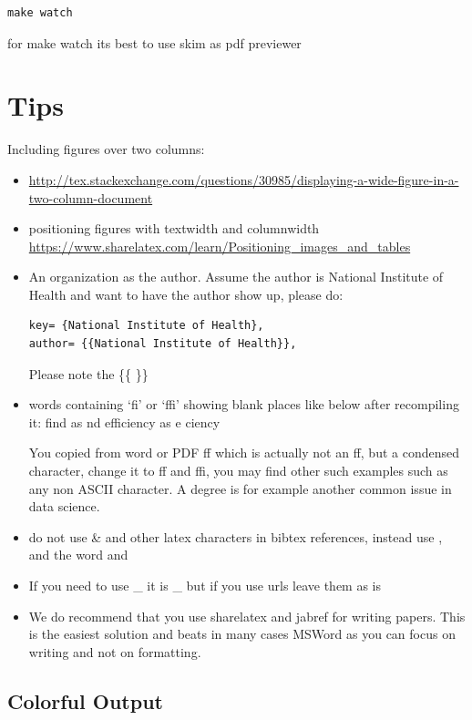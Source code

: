 \begin{verbatim}
make watch
\end{verbatim}

for make watch its best to use skim as pdf previewer


\section{Tips}\label{tips}

Including figures over two columns:

\begin{itemize}
\item
  \url{http://tex.stackexchange.com/questions/30985/displaying-a-wide-figure-in-a-two-column-document}
\item
  positioning figures with textwidth and columnwidth
  \url{https://www.sharelatex.com/learn/Positioning_images_and_tables}
\item
  An organization as the author. Assume the author is National Institute
  of Health and want to have the author show up, please do:

\begin{verbatim}
key= {National Institute of Health},
author= {{National Institute of Health}},
\end{verbatim}

  Please note the \{\{ \}\}
\item
  words containing `fi' or `ffi' showing blank places like below after
  recompiling it: find as nd efficiency as e ciency

  You copied from word or PDF ff which is actually not an ff, but a
  condensed character, change it to ff and ffi, you may find other such
  examples such as any non ASCII character. A degree is for example
  another common issue in data science.
\item
  do not use \textbar{} \& and other latex characters in bibtex
  references, instead use , and the word and
\item
  If you need to use \_ it is \_ but if you use urls leave them as is
\item
  We do recommend that you use sharelatex and jabref for writing papers.
  This is the easiest solution and beats in many cases MSWord as you can
  focus on writing and not on formatting.
\end{itemize}

\subsection{Colorful Output}

